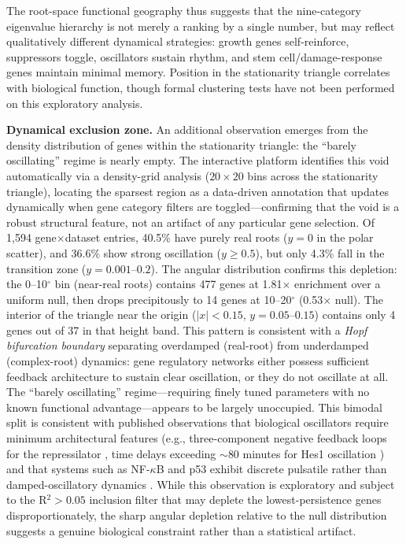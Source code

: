\documentclass[11pt,letterpaper]{article}
\begin{document}
The root-space functional geography thus suggests that the nine-category eigenvalue hierarchy is not merely a ranking by a single number, but may reflect qualitatively different dynamical strategies: growth genes self-reinforce, suppressors toggle, oscillators sustain rhythm, and stem cell/damage-response genes maintain minimal memory. Position in the stationarity triangle correlates with biological function, though formal clustering tests have not been performed on this exploratory analysis.

\textbf{Dynamical exclusion zone.} An additional observation emerges from the density distribution of genes within the stationarity triangle: the ``barely oscillating'' regime is nearly empty. The interactive platform identifies this void automatically via a density-grid analysis ($20 \times 20$ bins across the stationarity triangle), locating the sparsest region as a data-driven annotation that updates dynamically when gene category filters are toggled---confirming that the void is a robust structural feature, not an artifact of any particular gene selection. Of 1,594 gene$\times$dataset entries, 40.5\% have purely real roots ($y = 0$ in the polar scatter), and 36.6\% show strong oscillation ($y \geq 0.5$), but only 4.3\% fall in the transition zone ($y = 0.001$--$0.2$). The angular distribution confirms this depletion: the 0--10$^\circ$ bin (near-real roots) contains 477 genes at 1.81$\times$ enrichment over a uniform null, then drops precipitously to 14 genes at 10--20$^\circ$ (0.53$\times$ null). The interior of the triangle near the origin ($|x| < 0.15$, $y = 0.05$--$0.15$) contains only 4 genes out of 37 in that height band. This pattern is consistent with a \textit{Hopf bifurcation boundary} separating overdamped (real-root) from underdamped (complex-root) dynamics: gene regulatory networks either possess sufficient feedback architecture to sustain clear oscillation, or they do not oscillate at all. The ``barely oscillating'' regime---requiring finely tuned parameters with no known functional advantage---appears to be largely unoccupied. This bimodal split is consistent with published observations that biological oscillators require minimum architectural features (e.g., three-component negative feedback loops for the repressilator \citep{elowitz2000}, time delays exceeding $\sim$80 minutes for Hes1 oscillation \citep{jensen2003}) and that systems such as NF-$\kappa$B and p53 exhibit discrete pulsatile rather than damped-oscillatory dynamics \citep{purvis2012}. While this observation is exploratory and subject to the R$^2 > 0.05$ inclusion filter that may deplete the lowest-persistence genes disproportionately, the sharp angular depletion relative to the null distribution suggests a genuine biological constraint rather than a statistical artifact.
\end{document}
